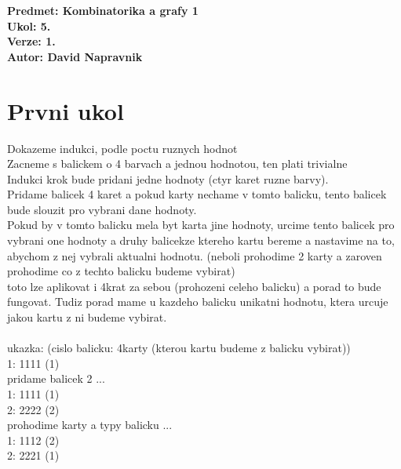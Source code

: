 \documentclass[a4paper]{article}
\begin{document}
\noindent
\textbf{Predmet: Kombinatorika a grafy 1}\\
\textbf{Ukol: 5.}\\
\textbf{Verze: 1.}\\
\textbf{Autor: David Napravnik}

\section*{Prvni ukol}
Dokazeme indukci, podle poctu ruznych hodnot\\
Zacneme s balickem o 4 barvach a jednou hodnotou, ten plati trivialne\\
Indukci krok bude pridani jedne hodnoty (ctyr karet ruzne barvy).\\
Pridame balicek 4 karet a pokud karty nechame v tomto balicku, tento balicek bude slouzit pro vybrani dane hodnoty.\\
Pokud by v tomto balicku mela byt karta jine hodnoty, urcime tento balicek pro vybrani one hodnoty a druhy balicekze ktereho kartu bereme
a nastavime na to, abychom z nej vybrali aktualni hodnotu. (neboli prohodime 2 karty a zaroven prohodime co z techto balicku budeme vybirat)\\
toto lze aplikovat i 4krat za sebou (prohozeni celeho balicku) a porad to bude fungovat.
Tudiz porad mame u kazdeho balicku unikatni hodnotu, ktera urcuje jakou kartu z ni budeme vybirat.\\
\\
ukazka: (cislo balicku: 4karty (kterou kartu budeme z balicku vybirat))\\
1: 1111 (1)\\
pridame balicek 2 ...\\
1: 1111 (1)\\
2: 2222 (2)\\
prohodime karty a typy balicku ...\\
1: 1112 (2)\\
2: 2221 (1)
\end{document}
